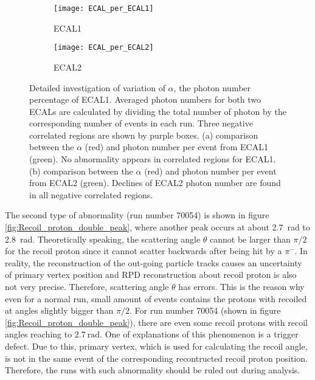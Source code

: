 \begin{figure*}[!h]
	\centering
	\vspace{1cm}
	\begin{subfigure}{\textwidth}
		\texttt{[image: ECAL\_per\_ECAL1]}
		\caption{ECAL1}
		\label{fig:ECAL_per_ECAL1}
		\vspace{1cm}
	\end{subfigure}
	\begin{subfigure}{\textwidth}
		\texttt{[image: ECAL\_per\_ECAL2]}
		\caption{ECAL2}
		\label{fig:ECAL_per_ECAL2}
	\end{subfigure}
	\caption{Detailed investigation of variation of $\alpha$, the photon number percentage of ECAL1. Averaged photon numbers for both two ECALs are calculated by dividing the total number of photon by the corresponding number of events in each run. Three negative correlated regions are shown by purple boxes. (a) comparison between the $\alpha$ (red) and photon number per event from ECAL1 (green). No abnormality appears in correlated regions for ECAL1. (b) comparison between the $\alpha$ (red) and photon number per event from ECAL2 (green). Declines of ECAL2 photon number are found in all negative correlated regions.}
	\label{fig:ECAL_per_ECAL}
	\vspace{1cm}
\end{figure*}

The second type of abnormality (run number 70054) is shown in figure \ref{fig:Recoil_proton_double_peak}, where another peak occurs at about \SI{2.7}{\radian} to \SI{2.8}{\radian}. Theoretically speaking, the scattering angle $\theta$ cannot be larger than $\pi/2$ for the recoil proton since it cannot scatter backwards after being hit by a $\pi^-$. In reality, the reconstruction of the out-going particle tracks causes an uncertainty of primary vertex position and RPD reconstruction about recoil proton is also not very precise. Therefore, scattering angle $\theta$ has errors. This is the reason why even for a normal run, small amount of events contains the protons with recoiled at angles slightly bigger than $\pi/2$. For run number 70054 (shown in figure \ref{fig:Recoil_proton_double_peak}), there are even some recoil protons with recoil angles reaching to $\SI{2.7}{\radian}$. One of explanations of this phenomenon is a trigger defect. Due to this, primary vertex, which is used for calculating the recoil angle, is not in the same event of the corresponding recontructed recoil proton position. Therefore, the runs with such abnormality should be ruled out during analysis.





